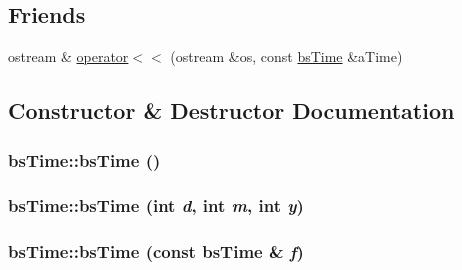 \subsection*{Friends}
\begin{DoxyCompactItemize}
\item 
ostream \& \hyperlink{classbs_time_a1c425c2199767868265d604dfb2ee400}{operator$<$$<$} (ostream \&os, const \hyperlink{classbs_time}{bsTime} \&aTime)
\end{DoxyCompactItemize}


\subsection{Constructor \& Destructor Documentation}
\hypertarget{classbs_time_ad87b7da7b60ced485c75776f81c03877}{
\subsubsection[{bsTime}]{\setlength{\rightskip}{0pt plus 5cm}bsTime::bsTime ()}}
\label{classbs_time_ad87b7da7b60ced485c75776f81c03877}
\hypertarget{classbs_time_ae40faef2e2332ef495cba2deb75ee384}{
\subsubsection[{bsTime}]{\setlength{\rightskip}{0pt plus 5cm}bsTime::bsTime (int {\em d}, \/  int {\em m}, \/  int {\em y})}}
\label{classbs_time_ae40faef2e2332ef495cba2deb75ee384}
\hypertarget{classbs_time_a48c518c543d62333bd024bfa8ac37624}{
\subsubsection[{bsTime}]{\setlength{\rightskip}{0pt plus 5cm}bsTime::bsTime (const {\bf bsTime} \& {\em f})}}
\label{classbs_time_a48c518c543d62333bd024bfa8ac37624}


